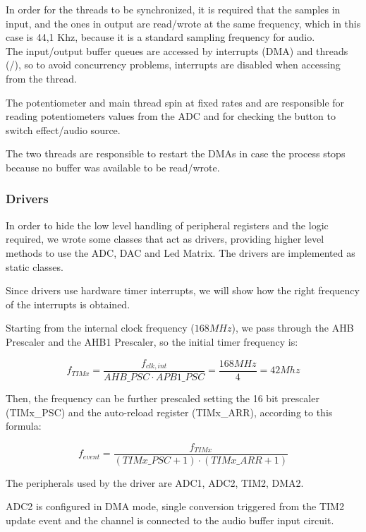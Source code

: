 In order for the threads to be synchronized, it is required that the samples in input, and the ones in output are read/wrote at the same frequency, which in this case is 44,1 Khz, because it is a standard sampling frequency for audio. \\
The input/output buffer queues are accessed by interrupts (DMA) and threads (/), so to avoid concurrency problems, interrupts are disabled when accessing from the thread.\par

The potentiometer and main thread spin at fixed rates and are responsible for reading potentiometers values from the ADC and for checking the button to switch effect/audio source.\par

The two  threads are responsible to restart the DMAs in case the process stops because no buffer was available to be read/wrote.

    
    
\subsubsection{Drivers}
\label{sec:Drivers}
In order to hide the low level handling of peripheral registers and the logic required, we wrote some classes that act as drivers, providing higher level methods to use the ADC, DAC and Led Matrix.
The drivers are implemented as static classes.


\label{sec:TIMx}

Since drivers use hardware timer interrupts, we will show how the right frequency of the interrupts is obtained. \par

Starting from the internal clock frequency ($168 MHz$), we pass through the AHB Prescaler and the AHB1 Prescaler, so the initial timer frequency is:

$$f_{TIMx} = \frac{f_{clk,int}}{AHB\_PSC \cdot APB1\_PSC} = \frac{168MHz}{4} =  42Mhz$$


Then, the frequency can be further prescaled setting the 16 bit prescaler (TIMx\_PSC) and the auto-reload register (TIMx\_ARR), according to this formula:

$$f_{event} = \frac{f_{TIMx}}{(TIMx\_PSC+1)\cdot(TIMx\_ARR+1)}$$

    
\label{sec:ADC}
The peripherals used by the driver are ADC1, ADC2, TIM2, DMA2.\par
ADC2 is configured in DMA mode, single conversion triggered from the TIM2 update event and the channel is connected to the audio buffer input circuit.\par


